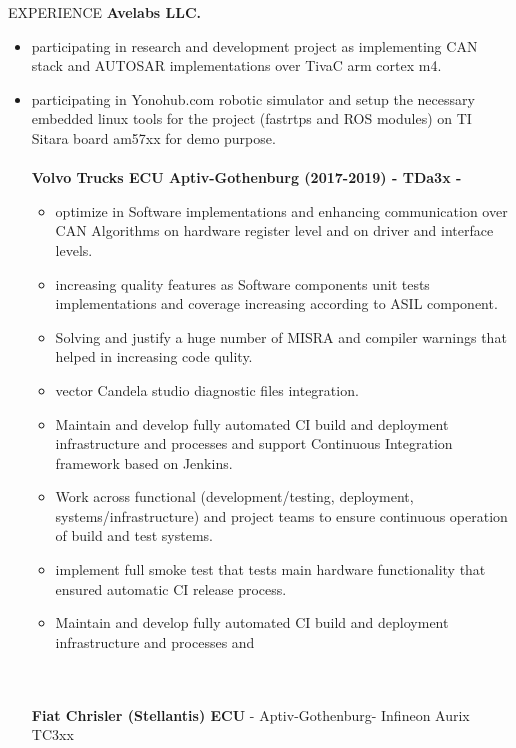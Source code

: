 \documentclass{resume} %
\begin{document}
\begin{rSection}{EXPERIENCE}
{\bf Avelabs LLC.}
\begin{itemize}
\setlength{\itemsep}{1pt}
  \setlength{\parskip}{0pt}
  \setlength{\parsep}{0pt}
    \item participating in research and development project as implementing CAN stack and AUTOSAR implementations over TivaC arm cortex m4.
     \item participating in Yonohub.com robotic simulator and setup the necessary embedded linux tools for the project (fastrtps and ROS modules) on TI Sitara board am57xx for demo purpose.
\\
\\{\bf Volvo Trucks ECU Aptiv-Gothenburg (2017-2019) - TDa3x - } 
\begin{itemize}
\setlength{\itemsep}{1pt}
  \setlength{\parskip}{0pt}
  \setlength{\parsep}{0pt}
    \item optimize in Software implementations and enhancing communication over CAN Algorithms on
hardware register level and on driver and interface levels.
  \item increasing quality features as Software components unit tests implementations and coverage
increasing according to ASIL component.
\item Solving and justify a huge number of MISRA and compiler warnings that helped in increasing
code qulity.
\item vector Candela studio diagnostic files integration.
    \item Maintain and develop fully automated CI build and deployment infrastructure and processes and
support Continuous Integration framework based on Jenkins.
\item Work across functional (development/testing, deployment, systems/infrastructure) and project
teams to ensure continuous operation of build and test systems.
\item implement full smoke test that tests main hardware functionality that ensured automatic CI release
process.
    \item Maintain and develop fully automated CI build and deployment infrastructure and processes and
\end{itemize}
\\
\\{\bf Fiat Chrisler (Stellantis) ECU} - Aptiv-Gothenburg- Infineon Aurix TC3xx\\
\begin{itemize}
\setlength{\itemsep}{1pt}
  \setlength{\parskip}{0pt}

\end{itemize}
\end{itemize}
\end{rSection}
\end{document}
